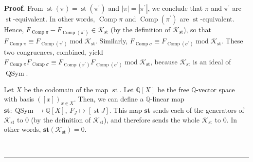 \documentclass[numbers=enddot,12pt,final,onecolumn,notitlepage]{scrartcl}%
\theoremstyle{definition}
\newenvironment{proof}[1][Proof]{\noindent\textbf{#1.} }{\ \rule{0.5em}{0.5em}}
\begin{document}
\begin{proof}
From $\operatorname*{st}\left(  \pi\right)  =\operatorname*{st}\left(
\pi^{\prime}\right)  $ and $\left\vert \pi\right\vert =\left\vert \pi^{\prime
}\right\vert $, we conclude that $\pi$ and $\pi^{\prime}$ are
$\operatorname*{st}$-equivalent. In other words, $\operatorname*{Comp}\pi$ and
$\operatorname*{Comp}\left(  \pi^{\prime}\right)  $ are $\operatorname*{st}%
$-equivalent. Hence, $F_{\operatorname*{Comp}\pi}-F_{\operatorname*{Comp}%
\left(  \pi^{\prime}\right)  }\in\mathcal{K}_{\operatorname*{st}}$ (by the
definition of $\mathcal{K}_{\operatorname*{st}}$), so that
$F_{\operatorname*{Comp}\pi}\equiv F_{\operatorname*{Comp}\left(  \pi^{\prime
}\right)  }\operatorname{mod}\mathcal{K}_{\operatorname*{st}}$. Similarly,
$F_{\operatorname*{Comp}\sigma}\equiv F_{\operatorname*{Comp}\left(
\sigma^{\prime}\right)  }\operatorname{mod}\mathcal{K}_{\operatorname*{st}}$.
These two congruences, combined, yield $F_{\operatorname*{Comp}\pi
}F_{\operatorname*{Comp}\sigma}\equiv F_{\operatorname*{Comp}\left(
\pi^{\prime}\right)  }F_{\operatorname*{Comp}\left(  \sigma^{\prime}\right)
}\operatorname{mod}\mathcal{K}_{\operatorname*{st}}$, because $\mathcal{K}%
_{\operatorname*{st}}$ is an ideal of $\operatorname*{QSym}$.

Let $X$ be the codomain of the map $\operatorname*{st}$. Let $\mathbb{Q}%
\left[  X\right]  $ be the free $\mathbb{Q}$-vector space with basis $\left(
\left[  x\right]  \right)  _{x\in X}$. Then, we can define a $\mathbb{Q}%
$-linear map $\mathbf{st}:\operatorname*{QSym}\rightarrow\mathbb{Q}\left[
X\right]  ,\ F_{J}\mapsto\left[  \operatorname*{st}J\right]  $. This map
$\mathbf{st}$ sends each of the generators of $\mathcal{K}_{\operatorname*{st}%
}$ to $0$ (by the definition of $\mathcal{K}_{\operatorname*{st}}$), and
therefore sends the whole $\mathcal{K}_{\operatorname*{st}}$ to $0$. In other
words, $\mathbf{st}\left(  \mathcal{K}_{\operatorname*{st}}\right)  =0$.


\end{proof}
\end{document}
